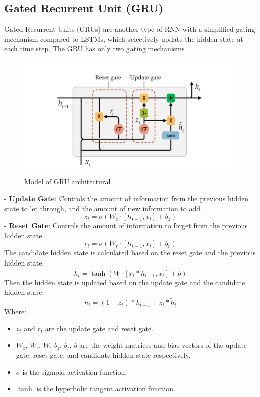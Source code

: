 \documentclass{ieeeojies}
\begin{document}
\subsection{Gated Recurrent Unit (GRU)}
Gated Recurrent Units (GRUs) are another type of RNN with a simplified gating mechanism compared to LSTMs, which selectively update the hidden state at each time step. The GRU has only two gating mechanisms
\begin{figure}[H]
    \centering
    \includegraphics[width=\linewidth]{./image/GRU.png}
    \caption{Model of GRU architectural}
    \label{fig:9}
\end{figure}
\noindent
- \textbf{Update Gate}: Controls the amount of information from the previous hidden state to let through, and the amount of new information to add.
\begin{dmath*}
    z_t = \sigma(W_z \cdot [h_{t-1}, x_t] + b_z)
\end{dmath*}
- \textbf{Reset Gate}: Controls the amount of information to forget from the previous hidden state.
\begin{dmath*}
    r_t = \sigma(W_r \cdot [h_{t-1}, x_t] + b_r)
\end{dmath*}
The candidate hidden state is calculated based on the reset gate and the previous hidden state.
\begin{dmath*}
    \tilde{h}_t = \tanh(W \cdot [r_t * h_{t-1}, x_t] + b)
\end{dmath*}
Then the hidden state is updated based on the update gate and the candidate hidden state.
\begin{dmath*}
    h_t = (1 - z_t) * h_{t-1} + z_t * \tilde{h}_t
\end{dmath*}
Where:
\begin{itemize}
    \item \(z_t\) and \(r_t\) are the update gate and reset gate.
    \item \(W_z\), \(W_r\), \(W\), \(b_z\), \(b_r\), \(b\) are the weight matrices and bias vectors of the update gate, reset gate, and candidate hidden state respectively.
    \item \(\sigma\) is the sigmoid activation function.
    \item \(\tanh\) is the hyperbolic tangent activation function.
\end{itemize}
\end{document}
